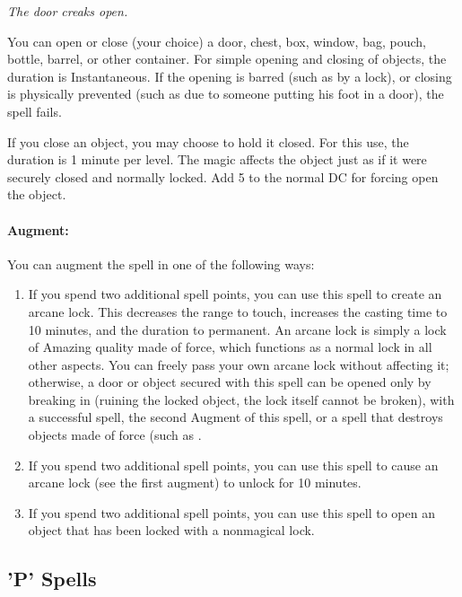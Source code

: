 \emph{The door creaks open.}

You can open or close (your choice) a door, chest, box, window, bag, pouch, bottle, barrel, or other container.
For simple opening and closing of objects, the duration is Instantaneous.
If the opening is barred (such as by a lock), or closing is physically prevented (such as due to someone putting his foot in a door), the spell fails.

If you close an object, you may choose to hold it closed. 
For this use, the duration is 1 minute per level. 
The magic affects the object just as if it were securely closed and normally locked.
Add 5 to the normal DC for forcing open the object.

\paragraph{Augment:} You can augment the spell in one of the following ways:
\begin{enumerate}
\item If you spend two additional spell points, you can use this spell to create an arcane lock. This decreases the range to touch, increases the casting time to 10 minutes, and the duration to permanent. 
An arcane lock is simply a lock of Amazing quality made of force, which functions as a normal lock in all other aspects.
You can freely pass your own arcane lock without affecting it; 
otherwise, a door or object secured with this spell can be opened only by breaking in (ruining the locked object, the lock itself cannot be broken), with a successful  spell, the second Augment of this spell, or a spell that destroys objects made of force (such as .
\item If you spend two additional spell points, you can use this spell to cause an arcane lock (see the first augment) to unlock for 10 minutes.
\item If you spend two additional spell points, you can use this spell to open an object that has been locked with a nonmagical lock.
\end{enumerate}
\subsection{'P' Spells}


